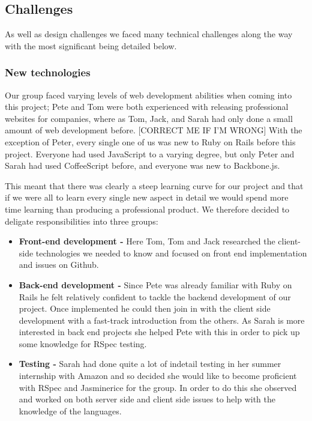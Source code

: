 \subsection{Challenges}
As well as design challenges we faced many technical challenges along the way with the most significant being detailed below.
  \subsubsection{New technologies}
    Our group faced varying levels of web development abilities when coming into this project; Pete and Tom were both experienced with releasing professional websites for companies, where as Tom, Jack, and Sarah had only done a small amount of web development before. [CORRECT ME IF I'M WRONG]
    With the exception of Peter, every single one of us was new to Ruby on Rails before this project. Everyone had used JavaScript to a varying degree, but only Peter and Sarah had used CoffeeScript before, and everyone was new to Backbone.js.

    This meant that there was clearly a steep learning curve for our project and that if we were all to learn every single new aspect in detail we would spend more time learning than producing a professional product.
    We therefore decided to deligate responsibilities into three groups:
    \begin{itemize}
      \item \textbf{Front-end development -} Here Tom, Tom and Jack researched the client-side technologies we needed to know and focused on front end implementation and issues on Github.
      \item \textbf{Back-end development -} Since Pete was already familiar with Ruby on Rails he felt relatively confident to tackle the backend development of our project. Once implemented he could then join in with the client side development with a fast-track introduction from the others. As Sarah is more interested in back end projects she helped Pete with this in order to pick up some knowledge for RSpec testing.
      \item \textbf{Testing -} Sarah had done quite a lot of indetail testing in her summer internship with Amazon and so decided she would like to become proficient with RSpec and Jasminerice for the group. In order to do this she observed and worked on both server side and client side issues to help with the knowledge of the languages.
    \end{itemize}

